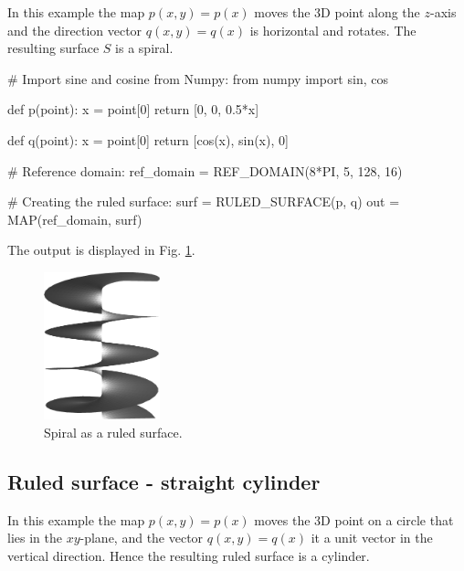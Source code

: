 In this example the map $p(x, y) = p(x)$ moves the 3D point 
along the $z$-axis and the direction vector $q(x, y) = q(x)$ 
is horizontal and rotates. The resulting surface $S$ is a spiral.

\begin{bluecode}
# Import sine and cosine from Numpy:
from numpy import sin, cos

def p(point):
    x = point[0]
    return [0, 0, 0.5*x]
  
def q(point):
    x = point[0]
    return [cos(x), sin(x), 0]

# Reference domain:  
ref_domain = REF_DOMAIN(8*PI, 5, 128, 16)

# Creating the ruled surface:
surf = RULED_SURFACE(p, q)
out = MAP(ref_domain, surf)
\end{bluecode}
The output is displayed in Fig. \ref{fig:curves-7}.\\

\begin{figure}[!ht]
\begin{center}
\includegraphics[width=0.3\textwidth]{img/curves-7.png}
\end{center}
\vspace{-4mm}
\caption{Spiral as a ruled surface.}
\label{fig:curves-7}
\end{figure}

\subsection{Ruled surface - straight cylinder}

In this example the map $p(x, y) = p(x)$ moves the 3D point on a circle 
that lies in the $xy$-plane, and the vector $q(x, y) = q(x)$ it a unit vector 
in the vertical direction. Hence the resulting ruled surface is a cylinder. 

